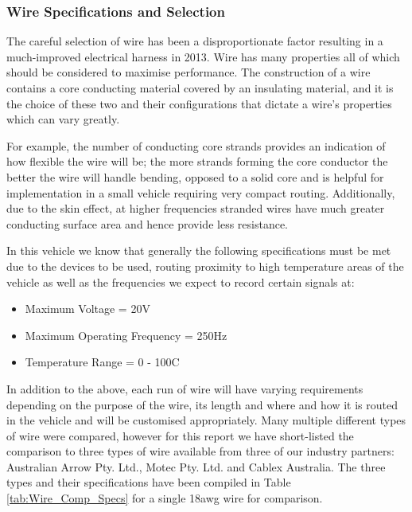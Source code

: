 \subsubsection{Wire Specifications and Selection}

The careful selection of wire has been a disproportionate factor resulting in a much-improved electrical harness in 2013.  Wire has many properties all of which should be considered to maximise performance.  The construction of a wire contains a core conducting material covered by an insulating material, and it is the choice of these two and their configurations that dictate a wire's properties which can vary greatly.

For example, the number of conducting core strands provides an indication of how flexible the wire will be; the more strands forming the core conductor the better the wire will handle bending, opposed to a solid core and is helpful for implementation in a small vehicle requiring very compact routing.  Additionally, due to the skin effect, at higher frequencies stranded wires have much greater conducting surface area and hence provide less resistance.

In this vehicle we know that generally the following specifications must be met due to the devices to be used, routing proximity to high temperature areas of the vehicle as well as the frequencies we expect to record certain signals at:
\begin{itemize}
	\item Maximum Voltage = 20V
	\item Maximum Operating Frequency = 250Hz
	\item Temperature Range = 0 - 100\degree C 
\end{itemize}

In addition to the above, each run of wire will have varying requirements depending on the purpose of the wire, its length and where and how it is routed in the vehicle and will be customised appropriately.  Many multiple different types of wire were compared, however for this report we have short-listed the comparison to three types of wire available from three of our industry partners: Australian Arrow Pty. Ltd., Motec Pty. Ltd. and Cablex Australia.  The three types and their specifications have been compiled in Table \ref{tab:Wire_Comp_Specs} for a single 18\acrshort{awg} wire for comparison.

